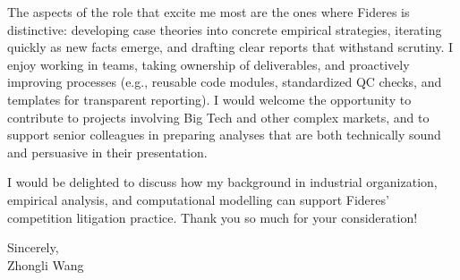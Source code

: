 \documentclass[11pt]{article}
\begin{document}
\vspace{0.2cm}

\noindent
The aspects of the role that excite me most are the ones where Fideres is distinctive: developing case theories into concrete empirical strategies, iterating quickly as new facts emerge, and drafting clear reports that withstand scrutiny. I enjoy working in teams, taking ownership of deliverables, and proactively improving processes (e.g., reusable code modules, standardized QC checks, and templates for transparent reporting). I would welcome the opportunity to contribute to projects involving Big Tech and other complex markets, and to support senior colleagues in preparing analyses that are both technically sound and persuasive in their presentation.

\vspace{0.2cm}

\noindent
I would be delighted to discuss how my background in industrial organization, empirical analysis, and computational modelling can support Fideres' competition litigation practice. Thank you so much for your consideration!

\vspace{0.45cm}

\noindent
Sincerely,\\[1cm]
Zhongli Wang
\end{document}
